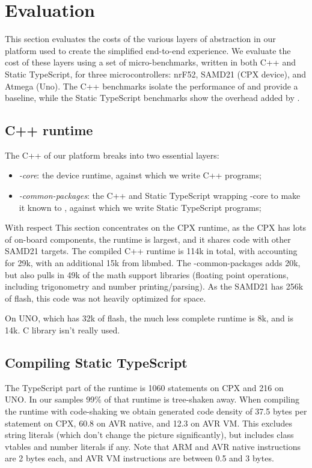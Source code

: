 \section{Evaluation}
\label{sec:evaluate}

This section evaluates the costs of the various layers of abstraction
in our platform used to create the simplified end-to-end experience. 
We evaluate the cost of these layers using a set of micro-benchmarks, written
in both C++ and Static TypeScript, for three microcontrollers: nrF52, SAMD21 (CPX device), and Atmega (Uno).
The C++ benchmarks isolate the performance
of \CO and provide a baseline, while the Static TypeScript benchmarks show the overhead
added by \MC. 

\subsection{C++ runtime}
The C++ of our platform breaks into two essential layers:
\begin{itemize}
\item \emph{\CON-core}: the \CO device runtime, against which we write C++ programs;
\item \emph{\MCN-common-packages}: the C++ and Static TypeScript wrapping \CON-core 
to make it known to \MC, against which we write Static TypeScript programs;
\end{itemize}
With respect 
This section concentrates on the CPX runtime, as the CPX has lots of on-board
components, the runtime is largest, and it shares code with other
SAMD21 \MC targets.
The compiled C++ runtime is 114k in total, with \CO accounting for 29k, with an
additional 15k from libmbed. The \MCN-common-packages adds 20k, but also pulls in
49k of the math support libraries (floating point operations,
including trigonometry and number printing/parsing).
As the SAMD21 has 256k of flash, this code was not heavily optimized for space.

On UNO, which has 32k of flash, the much less complete \MC runtime is 8k, and \CO
is 14k. C library isn't really used.

\subsection{Compiling Static TypeScript}

The TypeScript part of the runtime is 1060 statements on CPX and 216 on UNO.
In our samples 99\% of that runtime is tree-shaken away.
When compiling the runtime with code-shaking we obtain generated code density of 
37.5 bytes per statement on CPX, 60.8 on AVR native, and 12.3 on AVR VM.
This excludes string literals (which don't change the picture significantly), but includes class vtables and number literals
if any. Note that ARM and AVR native instructions are 2 bytes each, and AVR VM
instructions are between 0.5 and 3 bytes.

